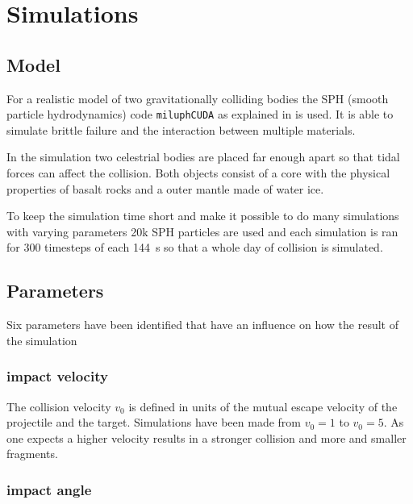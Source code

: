 

\chapter{Simulations}

\section{Model}

For a realistic model of two gravitationally colliding bodies the SPH (smooth particle hydrodynamics) code \texttt{miluphCUDA} as explained in \cite{Schaefer2016} is used. It is able to simulate brittle failure and the interaction between multiple materials. 

In the simulation two celestrial bodies are placed far enough apart so that tidal forces can affect the collision. Both objects consist of a core with the physical properties of basalt rocks and a outer mantle made of water ice. 

To keep the simulation time short and make it possible to do many simulations with varying parameters 20k SPH particles are used and each simulation is ran for 300 timesteps of each \SI{144}{\second} so that a whole day of collision is simulated.

\section{Parameters}

Six parameters have been identified that have an influence on how the result of the simulation

\subsection{impact velocity}

The collision velocity $v_0$ is defined in units of the mutual escape velocity of the projectile and the target. Simulations have been made from $v_0=1$ to $v_0=5$. As one expects a higher velocity results in a stronger collision and more and smaller fragments.

\subsection{impact angle}

